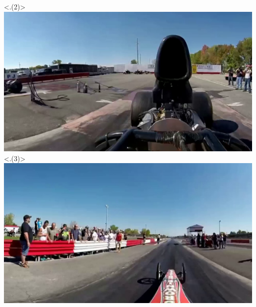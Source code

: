 \begin{frame}[c]
\begin{minipage}[t][4cm][t]{\textwidth}
{\begin{columns}[T]
\begin{column}{0.5\linewidth}
               \only<.(2)>{\hspace{2cm}\includegraphics[scale=0.065]{videos/fov1.png}}
               \only<.(3)>{\hspace{2cm}\includegraphics[scale=0.065]{videos/fov2.png}}
            \end{column}
         \end{columns}
      }
    \end{minipage}
    \vfill
\end{frame}

